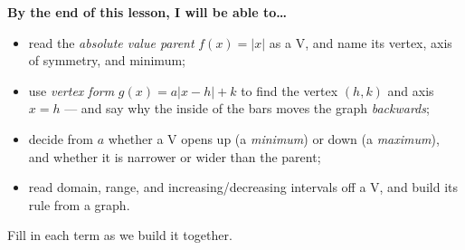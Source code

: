 \documentclass[10pt]{article}
\begin{document}

\vspace{0.10in}

\begin{objectivebox}
\textbf{By the end of this lesson, I will be able to\dots}
\begin{itemize}\setlength{\itemsep}{2pt}
  \item read the \emph{absolute value parent} $f(x)=|x|$ as a V, and name its vertex, axis of
        symmetry, and minimum;
  \item use \emph{vertex form} $g(x)=a|x-h|+k$ to find the vertex $(h,k)$ and axis $x=h$ ---
        and say why the inside of the bars moves the graph \emph{backwards};
  \item decide from $a$ whether a V opens up (a \emph{minimum}) or down (a \emph{maximum}), and
        whether it is narrower or wider than the parent;
  \item read domain, range, and increasing/decreasing intervals off a V, and build its rule from
        a graph.
\end{itemize}
\end{objectivebox}

\vspace{0.05in}

\begin{vocabbox}
\small
Fill in each term as we build it together.
\par\vspace{2pt}   %
\end{vocabbox}
\end{document}
